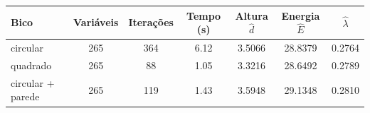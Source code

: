 \begin{tabular}{lcccccc}
\toprule
Bico & Variáveis & Iterações & Tempo (s) & Altura $\hat d$ & Energia $\hat E$ & $\hat\lambda$ \\
\midrule
circular & 265 & 364 & \num{6.12} & \num{3.5066} & \num{28.8379} & \num{0.2764} \\
quadrado & 265 & 88 & \num{1.05} & \num{3.3216} & \num{28.6492} & \num{0.2789} \\
circular + parede & 265 & 119 & \num{1.43} & \num{3.5948} & \num{29.1348} & \num{0.2810} \\
\bottomrule
\end{tabular}
